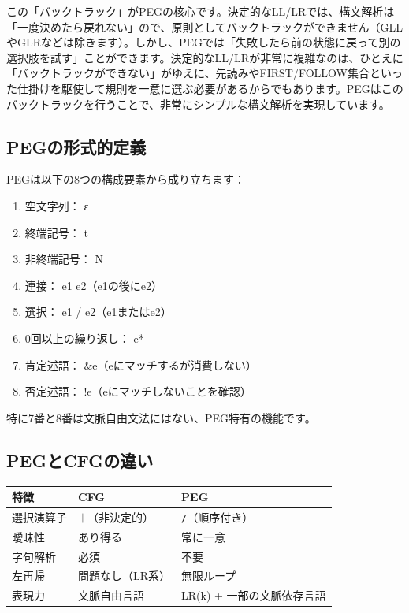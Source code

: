 この「バックトラック」がPEGの核心です。決定的なLL/LRでは、構文解析は「一度決めたら戻れない」ので、原則としてバックトラックができません（GLLやGLRなどは除きます）。しかし、PEGでは「失敗したら前の状態に戻って別の選択肢を試す」ことができます。決定的なLL/LRが非常に複雑なのは、ひとえに「バックトラックができない」がゆえに、先読みやFIRST/FOLLOW集合といった仕掛けを駆使して規則を一意に選ぶ必要があるからでもあります。PEGはこのバックトラックを行うことで、非常にシンプルな構文解析を実現しています。

\hypertarget{chapter5-pegux306eux5f62ux5f0fux7684ux5b9aux7fa9}{%
\subsection{PEGの形式的定義}\label{chapter5-pegux306eux5f62ux5f0fux7684ux5b9aux7fa9}}

PEGは以下の8つの構成要素から成り立ちます：

\begin{enumerate}
\def\labelenumi{\arabic{enumi}.}
\tightlist
\item
  空文字列： ε
\item
  終端記号： t
\item
  非終端記号： N
\item
  連接： e1 e2（e1の後にe2）
\item
  選択： e1 / e2（e1またはe2）
\item
  0回以上の繰り返し： e*
\item
  肯定述語： \&e（eにマッチするが消費しない）
\item
  否定述語： !e（eにマッチしないことを確認）
\end{enumerate}

特に7番と8番は文脈自由文法にはない、PEG特有の機能です。

\hypertarget{chapter5-pegux3068cfgux306eux9055ux3044}{%
\subsection{PEGとCFGの違い}\label{chapter5-pegux3068cfgux306eux9055ux3044}}

\begin{longtable}[]{@{}lll@{}}
\toprule
特徴 & CFG & PEG\tabularnewline
\midrule
\endhead
選択演算子 & \texttt{｜}（非決定的） &
\texttt{/}（順序付き）\tabularnewline
曖昧性 & あり得る & 常に一意\tabularnewline
字句解析 & 必須 & 不要\tabularnewline
左再帰 & 問題なし（LR系） & 無限ループ\tabularnewline
表現力 & 文脈自由言語 & LR(k) + 一部の文脈依存言語\tabularnewline
\bottomrule
\end{longtable}

